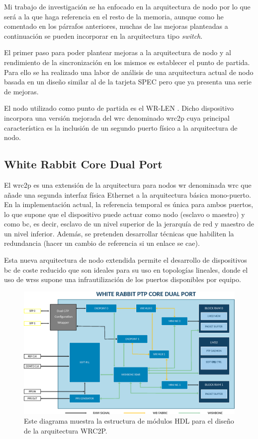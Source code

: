 Mi trabajo de investigación se ha enfocado en la arquitectura de nodo por lo 
que será a la que haga referencia en el resto de la memoria, aunque como he 
comentado en los párrafos anteriores, muchas de las mejoras planteadas a 
continuación se pueden incorporar en la arquitectura tipo \textit{switch}.

El primer paso para poder plantear mejoras a la arquitectura de nodo y al 
rendimiento de la sincronización en los mismos es establecer el punto de 
partida. Para ello se ha realizado una labor de análisis de una arquitectura 
actual de nodo basada en un diseño similar al de la tarjeta SPEC pero 
que ya presenta una serie de mejoras.

El nodo utilizado como punto de partida es el WR-LEN \cite{website:len}. Dicho 
dispositivo incorpora una versión 
mejorada del \gls{wrc} denominado \gls{wrc2p} cuya principal característica es 
la inclusión de un segundo puerto físico a la arquitectura de nodo.

\subsection{White Rabbit Core Dual Port}

El \gls{wrc2p} \cite{felipe16} es una extensión de la arquitectura para nodos 
\gls{wr} 
denominada \acrlong{wrc} \cite{Daniluk2012} que añade una segunda interfaz 
física 
Ethernet a la arquitectura básica mono-puerto. En la implementación actual, la 
referencia temporal es única para ambos puertos, lo que supone que el 
dispositivo puede actuar como nodo (esclavo o maestro) y como \gls{bc}, es 
decir, esclavo de un nivel superior de la jerarquía de red y maestro de un 
nivel inferior. Además, se pretenden desarrollar técnicas que habiliten la 
redundancia (hacer un cambio de referencia si un enlace se cae).

Esta nueva arquitectura de nodo extendida permite el desarrollo de dispositivos 
\gls{bc} de coste reducido que son ideales para su uso en topologías lineales, 
donde el uso de \gls{wrs}s supone una infrautilización de los puertos 
disponibles por equipo.

\begin{figure}
	\centering
	\includegraphics[width=\linewidth]{imagenes/wrpc_dp}
	\caption[Diagrama de bloques del WRC2P]{Este diagrama muestra la estructura 
	de módulos HDL para el diseño de la arquitectura WRC2P.}
	\label{fig:wrpcdp}
\end{figure}


